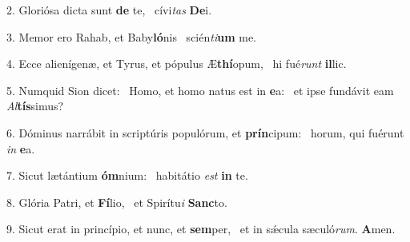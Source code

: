 2. Gloriósa dicta sunt \textbf{de} te, \ast\  cívi\textit{tas} \textbf{De}i.\

3. Memor ero Rahab, et Baby\textbf{ló}nis \ast\  scién\textit{ti}\textbf{um} me.\

4. Ecce alienígenæ, et Tyrus, et pópulus Æ\textbf{thí}opum, \ast\  hi fué\textit{runt} \textbf{il}lic.\

5. Numquid Sion dicet: \dag\  Homo, et homo natus est in \textbf{e}a: \ast\  et ipse fundávit eam \textit{Al}\textbf{tís}simus?\

6. Dóminus narrábit in scriptúris populórum, et \textbf{prín}cipum: \ast\  horum, qui fuérunt \textit{in} \textbf{e}a.\

7. Sicut lætántium \textbf{óm}nium: \ast\  habitátio \textit{est} \textbf{in} te.\

8. Glória Patri, et \textbf{Fí}lio, \ast\  et Spirítu\textit{i} \textbf{Sanc}to.\

9. Sicut erat in princípio, et nunc, et \textbf{sem}per, \ast\  et in sǽcula sæculó\textit{rum}. \textbf{A}men.\

